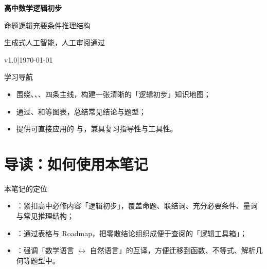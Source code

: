 \documentclass[a4paper,11pt]{ctexart}
\renewcommand{\notetitle}{高中数学逻辑初步}
\renewcommand{\noteauthor}{生成式人工智能，人工审阅通过}
\renewcommand{\notedate}{\today}
\renewcommand{\notesubtitle}{命题逻辑\quad 充要条件\quad 推理结构}
\renewcommand{\noteversion}{v1.0}
\begin{document}
\thispagestyle{empty}
\setcounter{page}{1}

\noindent
\begin{minipage}[t][0.7\textheight][c]{\textwidth}
  \raggedleft
  \vspace*{\fill}
  {\sffamily\bfseries\Huge\color{accent}\notetitle\par}
  \vspace{0.6em}
  {\Large\color{inkgray}\notesubtitle\par}
  \vspace{0.5em}
  {\large\color{inkgray}\noteauthor\par}
  \vspace{0.4em}
  {\normalsize\color{inkgray}\noteversion\quad|\quad\notedate\par}
  \vspace*{\fill}
\end{minipage}

\begin{center}
\begin{minipage}{0.84\textwidth}
  \textcolor{inkgray}{\sffamily\small 学习导航}\\
  \begin{itemize}
    \item 围绕、、、四条主线，构建一张清晰的「逻辑初步」知识地图；
    \item 通过、和等图表，总结常见结论与题型；
    \item 提供可直接应用的 与，兼具复习指导性与工具性。
  \end{itemize}
\end{minipage}
\end{center}
\vspace{1em}

\clearpage
\thispagestyle{plain}
\tableofcontents

\clearpage

\section*{导读：如何使用本笔记}

\begin{summarybox}{本笔记的定位}
  \begin{itemize}
    \item {}：紧扣高中必修内容「逻辑初步」，覆盖命题、联结词、充分必要条件、量词与常见推理结构；
    \item {}：通过表格与 Roadmap，把零散结论组织成便于查阅的「逻辑工具箱」；
    \item {}：强调「数学语言 $\leftrightarrow$ 自然语言」的互译，方便迁移到函数、不等式、解析几何等题型中。
  \end{itemize}
\end{summarybox}
\end{document}
